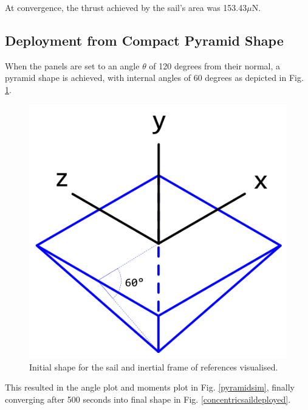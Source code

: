 At convergence, the thrust achieved by the sail's area was 153.43$\mu$N.

\subsection{Deployment from Compact Pyramid Shape}\label{res:pyramid}

When the panels are set to an angle $\theta$ of 120 degrees from their normal, a pyramid shape is achieved, with internal angles of 60 degrees as depicted in Fig. \ref{pyramid}.

\begin{figure}[H]
\centering
  \includegraphics[width=0.5\linewidth]{images/third/pyramidshape.png}
\caption{Initial shape for the sail and inertial frame of references visualised.}
\label{pyramid}
\end{figure}

This resulted in the angle plot and moments plot in Fig. \ref{pyramidsim}, finally converging after 500 seconds into final shape in Fig. \ref{concentricsaildeployed}.

